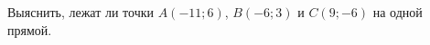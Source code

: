 \begin{ex}
	\begin{condition}
		Выяснить, лежат ли точки \( A(-11;6) \), \( B(-6;3) \) и \( C(9;-6) \) на одной прямой.
	\end{condition}
\end{ex}